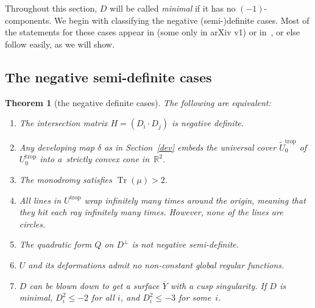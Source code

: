 \documentclass[11pt]{article}
\numberwithin{equation}{section}
\numberwithin{figure}{section}
\numberwithin{table}{section}
\DeclareMathOperator{\Tr}{Tr}
\DeclareMathOperator{\trop}{trop}
\let\?=\overline
\let\bb=\mathbb
\let\wt=\widetilde
\newtheorem{thm}{Theorem}[section]
\theoremstyle{definition}
\begin{document}
Throughout this section, $D$ will be called {\it minimal} if it has no $(-1)$-components. We begin with classifying the negative (semi-)definite cases. Most of the statements for these cases appear in \cite{GHK1} (some only in arXiv v1) or in~\cite{GHK2}, or else follow easily, as we will show.

\subsection{The negative semi-definite cases}

\begin{thm}[the negative definite cases]\label{NegD}
The following are equivalent:
\begin{enumerate}\itemsep=0pt
\item[$1.$] The {intersection matrix} $H=(D_i \cdot D_j)$ is negative definite.
\item[$2.$] Any {developing map} $\delta$ as in Section~{\rm \ref{dev}} embeds the universal cover $\wt{U}_0^{\trop}$ of $U^{\trop}_0$ into a~strictly convex cone in~$\bb{R}^2$.
\item[$3.$] The {monodromy} satisfies $\Tr(\mu) > 2$.
\item[$4.$] All {lines} in $U^{\trop}$ wrap infinitely many times around the origin, meaning that they hit each ray infinitely many times. However, none of the lines are circles.
\item[$5.$] The {quadratic form} $Q$ on $D^{\perp}$ is not negative semi-definite.
\item[$6.$] $U$ and its deformations admit no non-constant global regular {functions}.
\item[$7.$] $D$ can be blown down to get a surface $\?{Y}$ with a cusp singularity. If $D$ is minimal, $D_i^2 \leq -2$ for all $i$, and $D_i^2 \leq -3$ for some~$i$.
\end{enumerate}
\end{thm}
\end{document}
